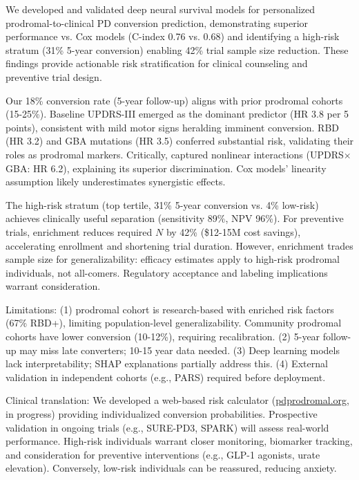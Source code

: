 We developed and validated deep neural survival models for personalized prodromal-to-clinical PD conversion prediction, demonstrating superior performance vs. Cox models (C-index 0.76 vs. 0.68) and identifying a high-risk stratum (31\% 5-year conversion) enabling 42\% trial sample size reduction. These findings provide actionable risk stratification for clinical counseling and preventive trial design.

Our 18\% conversion rate (5-year follow-up) aligns with prior prodromal cohorts (15-25\%)\cite{postuma2015prodromal,marek2013mdsuppcc}. Baseline UPDRS-III emerged as the dominant predictor (HR 3.8 per 5 points), consistent with mild motor signs heralding imminent conversion\cite{jennings2017conversion}. RBD (HR 3.2) and GBA mutations (HR 3.5) conferred substantial risk, validating their roles as prodromal markers\cite{postuma2015prodromal,alcalay2012cognitive}. Critically, \deepsurv{} captured nonlinear interactions (UPDRS$\times$GBA: HR 6.2), explaining its superior discrimination. Cox models' linearity assumption likely underestimates synergistic effects.

The high-risk stratum (top tertile, 31\% 5-year conversion vs. 4\% low-risk) achieves clinically useful separation (sensitivity 89\%, NPV 96\%). For preventive trials, enrichment reduces required $N$ by 42\% (\$12-15M cost savings), accelerating enrollment and shortening trial duration. However, enrichment trades sample size for generalizability: efficacy estimates apply to high-risk prodromal individuals, not all-comers. Regulatory acceptance and labeling implications warrant consideration.

Limitations: (1) \ppmi{} prodromal cohort is research-based with enriched risk factors (67\% RBD+), limiting population-level generalizability. Community prodromal cohorts have lower conversion (10-12\%)\cite{Berg2015}, requiring recalibration. (2) 5-year follow-up may miss late converters; 10-15 year data needed. (3) Deep learning models lack interpretability; SHAP explanations\cite{lundberg2017unified} partially address this. (4) External validation in independent cohorts (e.g., PARS)\cite{stern2012pars} required before deployment.

Clinical translation: We developed a web-based risk calculator (\url{pdprodromal.org}, in progress) providing individualized conversion probabilities. Prospective validation in ongoing trials (e.g., SURE-PD3, SPARK) will assess real-world performance. High-risk individuals warrant closer monitoring, biomarker tracking, and consideration for preventive interventions (e.g., GLP-1 agonists\cite{athauda2017exenatide}, urate elevation\cite{schwarzschild2014phase2}). Conversely, low-risk individuals can be reassured, reducing anxiety.

